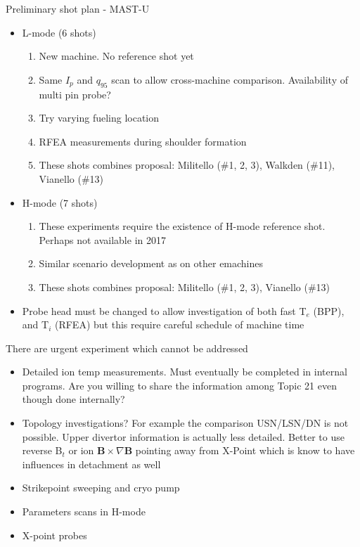 \documentclass[10pt, compress]{beamer}
\begin{document}
\begin{frame}{Preliminary shot plan  - MAST-U}
	\begin{itemize}
		\item L-mode (6 shots)
		\begin{enumerate}		
			\item New machine. No reference shot yet			
			\item Same $I_p$ and $q_95$ scan to allow
                          cross-machine comparison. Availability of multi pin probe? 
			\item Try varying fueling location
			\item RFEA measurements during shoulder
                          formation 
                        \item These shots combines proposal: Militello
                          (\#1, 2, 3), Walkden (\#11), Vianello (\#13)
		\end{enumerate}
		\item H-mode (7 shots)
		\begin{enumerate}
			\item These experiments require the existence of H-mode reference shot. Perhaps not available in 2017
			\item Similar scenario development as on other emachines
                        \item These shots combines proposal: Militello
                          (\#1, 2, 3),  Vianello (\#13)
		\end{enumerate}
		\item Probe head must be changed to allow
                  investigation of both fast T$_e$ (BPP),  and T$_i$
                  (RFEA) but this require careful schedule of machine time
	\end{itemize}
\end{frame}

\begin{frame}{There are urgent experiment which cannot be addressed}
\begin{itemize}
	\item Detailed ion temp measurements. Must eventually be
          completed in internal programs. Are you willing to share the
          information among Topic 21 even though done internally?
	\item Topology investigations? For example the comparison
          USN/LSN/DN is not possible. Upper divertor information is
          actually less detailed. Better to use reverse B$_t$ or ion
          $\mathbf{B}\times\nabla\mathbf{B}$ pointing away from
          X-Point which is know to have influences in detachment as
          well \parencite{McLean}
	\item Strikepoint sweeping and cryo pump
	\item Parameters scans in H-mode
	\item X-point probes
\end{itemize}
\end{frame}
\end{document}
